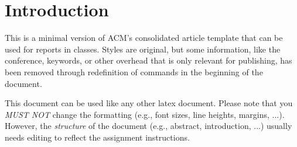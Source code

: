 \section{Introduction}

This is a minimal version of ACM's consolidated article template that can be used for reports in classes.
Styles are original, but some information, like the conference, keywords, or other overhead that is only relevant for publishing, has been removed through redefinition of commands in the beginning of the document.

This document can be used like any other latex document.
Please note that you \emph{MUST NOT} change the formatting (e.g., font sizes, line heights, margins, ...).
However, the \emph{structure} of the document (e.g., abstract, introduction, ...) usually needs editing to reflect the assignment instructions.